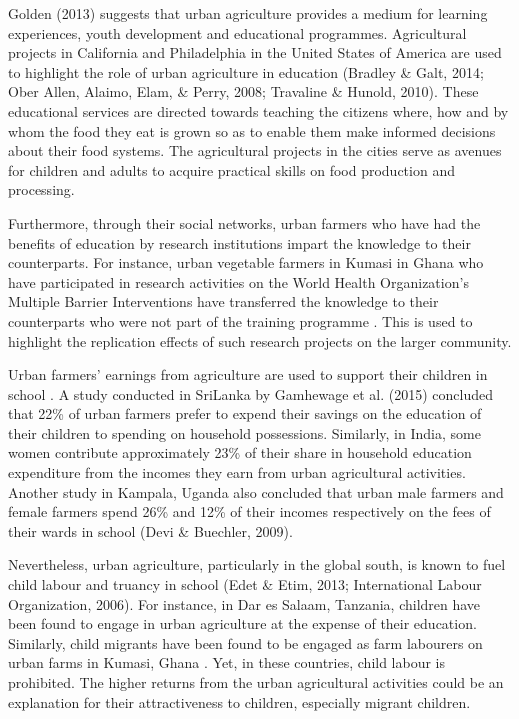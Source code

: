 Golden (2013) suggests that urban agriculture provides a medium for learning experiences, youth development and educational programmes. Agricultural projects in California and Philadelphia in the United States of America are used to highlight the role of urban agriculture in education (Bradley \& Galt, 2014; Ober Allen, Alaimo, Elam, \& Perry, 2008; Travaline \& Hunold, 2010). These educational services are directed towards teaching the citizens where, how and by whom the food they eat is grown so as to enable them make informed decisions about their food systems. The agricultural projects in the cities serve as avenues for children and adults to acquire practical skills on food production and processing.

Furthermore, through their social networks, urban farmers who have had the benefits of education by research institutions impart the knowledge to their counterparts. For instance, urban vegetable farmers in Kumasi in Ghana who have participated in research activities on the World Health Organization's Multiple Barrier Interventions have transferred the knowledge to their counterparts who were not part of the training programme \cite{Amponsah2015, Amponsah2016}. This is used to highlight the replication effects of such research projects on the larger community.

Urban farmers' earnings from agriculture are used to support their children in school \cite{Prain2010}. A study conducted in SriLanka by Gamhewage et al. (2015) concluded that 22\% of urban farmers prefer to expend their savings on the education of their children to spending on household possessions. Similarly, in India, some women contribute approximately 23\% of their share in household education expenditure from the incomes they earn from urban agricultural activities. Another study in Kampala, Uganda also concluded that urban male farmers and female farmers spend 26\% and 12\% of their incomes respectively on the fees of their wards in school (Devi \& Buechler, 2009).

Nevertheless, urban agriculture, particularly in the global south, is known to fuel child labour and truancy in school (Edet \& Etim, 2013; International Labour Organization, 2006). For instance, in Dar es Salaam, Tanzania, children have been found to engage in urban agriculture at the expense of their education. Similarly, child migrants have been found to be engaged as farm labourers on urban farms in Kumasi, Ghana \cite{Amponsah2016a}. Yet, in these countries, child labour is prohibited. The higher returns from the urban agricultural activities could be an explanation for their attractiveness to children, especially migrant children.


